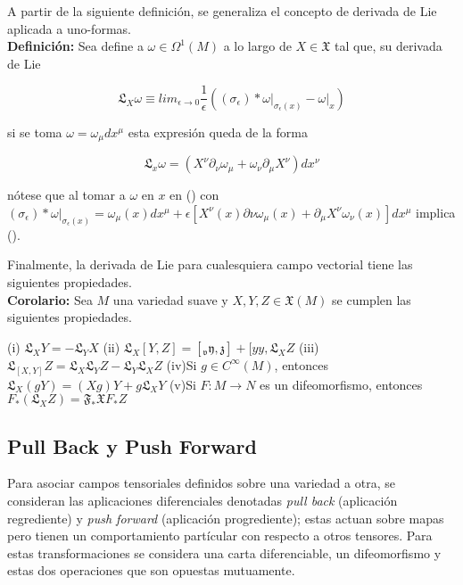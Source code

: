 \documentclass{report}
\begin{document}
{A partir de la siguiente definición, se generaliza el concepto de derivada de Lie aplicada a uno-formas.\\

\textbf{Definición:} Sea define a $\omega \in \Omega ^{1}(M)$ a lo largo de $X \in \mathfrak{X}$ tal que, su derivada de Lie

\begin{equation}
\mathfrak{L}_{X} \omega \equiv lim_{\epsilon \to 0} \frac{1}{\epsilon} ((\sigma _{\epsilon})* \omega \vert _{\sigma _{\epsilon}(x)} - \omega \vert _{x})
\end{equation}  

si se toma $\omega = \omega _{\mu} dx^{\mu}$ esta expresión queda de la forma

\begin{equation}
\mathfrak{L}_{x}\omega = (X^{\nu} \partial _{\nu} \omega _{\mu} + \omega _{\nu} \partial_{\mu } X^{\nu}) dx^{\nu}
\end{equation}

nótese que al tomar a $\omega$ en $x$ en () con $(\sigma _{\epsilon})* \omega \vert _{\sigma _{\epsilon}(x)} = \omega _{\mu} (x) dx^{\mu} + \epsilon [X^{\nu}(x) \partial \nu \omega _{\mu}(x)+\partial _{\mu} X^{\nu}\omega _{\nu} (x)]dx^{\mu}$ implica ().

Finalmente, la derivada de Lie para cualesquiera campo vectorial tiene las siguientes propiedades.\\


\textbf{Corolario:} Sea $M$ una variedad suave y $X, Y, Z \in \mathfrak{X}(M)$ se cumplen las siguientes propiedades.

(i) $\mathfrak{L}_{X} Y = - \mathfrak{L} _{Y}X$
(ii) $\mathfrak{L}_{X}[Y,Z]=[\mathfrak{_{v} y, z}] + [yy, \mathfrak{L}_{X}Z$
(iii)$\mathfrak{L}_[X,Y]Z = \mathfrak{L}_{X}\mathfrak{L}_{Y} Z - \mathfrak{L}_{Y} \mathfrak{L}_{X}Z$
(iv)Si $g \in C^{\infty}(M)$, entonces $\mathfrak{L}_{X}(gY) = (Xg)Y + g \mathfrak{L}_{X}Y$
(v)Si $F:M \rightarrow N$ es un difeomorfismo, entonces $F_{*}(\mathfrak{L}_{X}Z) = \mathfrak{F_{*}X}F_{*}Z$


\subsection{Pull Back y Push Forward }



Para asociar campos tensoriales definidos sobre una variedad a otra, se consideran las aplicaciones diferenciales denotadas \textit{pull back} (aplicación regrediente) y \textit{push forward} (aplicación progrediente); estas actuan sobre mapas pero tienen un comportamiento partícular con respecto a otros tensores. Para estas transformaciones se considera una carta diferenciable, un difeomorfismo y estas dos operaciones que son opuestas mutuamente.

}
\end{document}
